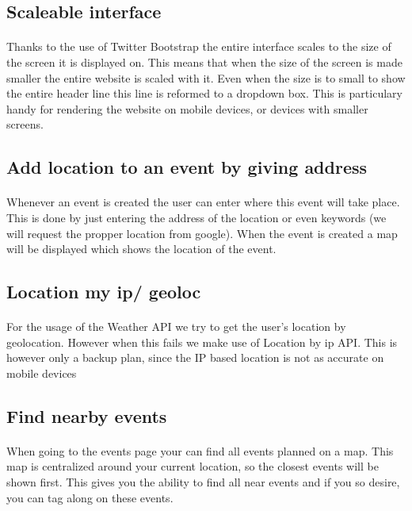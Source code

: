 \documentclass[11pt,a4paper]{scrartcl}
\begin{document}
\subsection{Scaleable interface}
\paragraph{}Thanks to the use of Twitter Bootstrap the entire interface scales to the size of the screen it is displayed on. This means that when the size of the screen is made smaller the entire website is scaled with it. Even when the size is to small to show the entire header line this line is reformed to a dropdown box. This is particulary handy for rendering the website on mobile devices, or devices with smaller screens.
\subsection{Add location to an event by giving address}
\paragraph{}Whenever an event is created the user can enter where this event will take place. This is done by just entering the address of the location or even keywords (we will request the propper location from google). When the event is created a map will be displayed which shows the location of the event.
\subsection{Location my ip/ geoloc}
\paragraph{}For the usage of the Weather API we try to get the user's location by geolocation. However when this fails we make use of Location by ip API. This is however only a backup plan, since the IP based location is not as accurate on mobile devices
\subsection{Find nearby events}
\paragraph{}When going to the events page your can find all events planned on a map. This map is centralized around your current location, so the closest events will be shown first. This gives you the ability to find all near events and if you so desire, you can tag along on these events.
\end{document}
